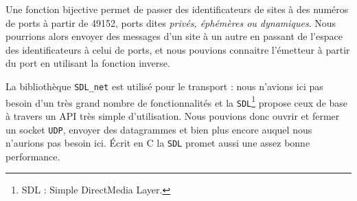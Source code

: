 Une fonction bijective permet de passer des identificateurs de sites à des numéros de ports à partir de \textsc{49152}, ports dites \emph{privés, éphémères ou dynamiques}. Nous pourrions alors envoyer des messages d'un site à un autre en passant de l'espace des identificateurs à celui de ports, et nous pouvions connaitre l'émetteur à partir du port en utilisant la fonction inverse. 

La bibliothèque \texttt{SDL\_net} est utilisé pour le transport : nous n'avions ici pas besoin d'un très grand nombre de fonctionnalités et la \texttt{SDL}\footnote{SDL : Simple DirectMedia Layer.} propose ceux de base à travers un API très simple d'utilisation. Nous pouvions donc ouvrir et fermer un socket \texttt{UDP}, envoyer des datagrammes et bien plus encore auquel nous n'aurions pas besoin ici. Écrit en C la \texttt{SDL} promet aussi une assez bonne performance. 